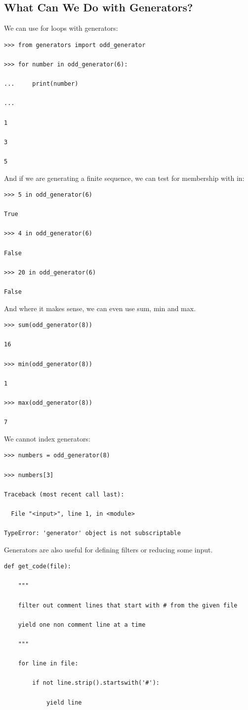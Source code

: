 \documentclass{article}
\begin{document}
\subsection{What Can We Do with Generators?}
We can use for loops with generators:

\begin{lstlisting}
>>> from generators import odd_generator

>>> for number in odd_generator(6):

...     print(number)

... 

1

3

5
\end{lstlisting}

And if we are generating a finite sequence, we can test for membership with in:

\begin{lstlisting}
>>> 5 in odd_generator(6)

True

>>> 4 in odd_generator(6)

False

>>> 20 in odd_generator(6)

False
\end{lstlisting}

And where it makes sense, we can even use sum, min and max.

\begin{lstlisting}
>>> sum(odd_generator(8))

16

>>> min(odd_generator(8))

1

>>> max(odd_generator(8))

7
\end{lstlisting}

We cannot index generators:

\begin{lstlisting}
>>> numbers = odd_generator(8)

>>> numbers[3]

Traceback (most recent call last):

  File "<input>", line 1, in <module>

TypeError: 'generator' object is not subscriptable
\end{lstlisting}

Generators are also useful for defining filters or reducing some input.

\begin{lstlisting}
def get_code(file):

    """

    filter out comment lines that start with # from the given file

    yield one non comment line at a time

    """

    for line in file:

        if not line.strip().startswith('#'):

            yield line
\end{lstlisting}
\end{document}
